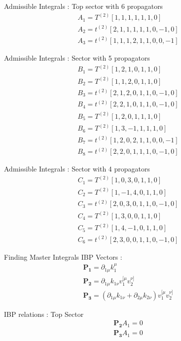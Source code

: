 \documentclass[11pt]{beamer}
\begin{document}
\begin{frame}
	Admissible Integrals : Top sector with 6 propagators
	\begin{align*}
		A_1=T^{(2)}[1,1,1,1,1,1,0]\\
		A_2=t^{(2)}[2,1,1,1,1,1,0,-1,0]\\
		A_3=t^{(2)}[1,1,1,2,1,1,0,0,-1]
	\end{align*}
\end{frame}
\begin{frame}
	Admissible Integrals : Sector with 5 propagators
	\begin{align*}
		B_1=T^{(2)}[1,2,1,0,1,1,0]\\
		B_2=T^{(2)}[1,1,2,0,1,1,0]\\
		B_3=t^{(2)}[2,1,2,0,1,1,0,-1,0]\\
		B_4=t^{(2)}[2,2,1,0,1,1,0,-1,0]\\
		B_5=T^{(2)}[1,2,0,1,1,1,0]\\
		B_6=T^{(2)}[1,3,-1,1,1,1,0]\\
		B_7=t^{(2)}[1,2,0,2,1,1,0,0,-1]\\
		B_8=t^{(2)}[2,2,0,1,1,1,0,-1,0]
	\end{align*}
\end{frame}
\begin{frame}
	Admissible Integrals : Sector with 4 propagators
	\begin{align*}
		C_1=T^{(2)}[1,0,3,0,1,1,0]\\
		C_2=T^{(2)}[1,-1,4,0,1,1,0]\\
		C_3=t^{(2)}[2,0,3,0,1,1,0,-1,0]\\
		C_4=T^{(2)}[1,3,0,0,1,1,0]\\
		C_5=T^{(2)}[1,4,-1,0,1,1,0]\\
		C_6=t^{(2)}[2,3,0,0,1,1,0,-1,0]
	\end{align*}
\end{frame}
\begin{frame}{Finding Master Integrals}
	IBP Vectors : 
	\begin{align}
		\boldsymbol{P_1}=\partial_{1\mu}k_1^\mu\\
		\boldsymbol{P_2}=\partial_{1\mu}k_{1\nu} v_1^{[\mu}v_2^{\nu]}\\
		\boldsymbol{P_3}=(\partial_{1\mu}k_{1\nu}+\partial_{2\mu}k_{2\nu})v_1^{[\mu}v_2^{\nu]}
	\end{align}
\end{frame}
\begin{frame}
	IBP relations : Top Sector
	\begin{align*}
	\boldsymbol{P_2}A_1=0 \\	
	\boldsymbol{P_3}A_1=0
	\end{align*}
\end{frame}
\end{document}
